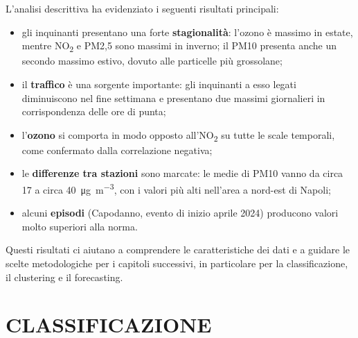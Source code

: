 \documentclass[11pt]{report}
\begin{document}
L'analisi descrittiva ha evidenziato i seguenti risultati principali:
\begin{itemize}
  \item gli inquinanti presentano una forte \textbf{stagionalità}: l'ozono è
        massimo in estate, mentre NO\textsubscript{2} e PM2,5 sono massimi in
        inverno; il PM10 presenta anche un secondo massimo estivo, dovuto alle
        particelle più grossolane;
  \item il \textbf{traffico} è una sorgente importante: gli inquinanti a esso
        legati diminuiscono nel fine settimana e presentano due massimi giornalieri
        in corrispondenza delle ore di punta;
  \item l'\textbf{ozono} si comporta in modo opposto all'NO\textsubscript{2} su
        tutte le scale temporali, come confermato dalla correlazione negativa;
  \item le \textbf{differenze tra stazioni} sono marcate: le medie di PM10 vanno
        da circa 17 a circa \SI{40}{\micro\gram\per\cubic\metre}, con i valori più
        alti nell'area a nord-est di Napoli;
  \item alcuni \textbf{episodi} (Capodanno, evento di inizio aprile 2024)
        producono valori molto superiori alla norma.
\end{itemize}

Questi risultati ci aiutano a comprendere le caratteristiche dei dati e a guidare le scelte metodologiche per 
i capitoli successivi, in particolare per la classificazione, il clustering e il forecasting.


\chapter{CLASSIFICAZIONE}
\end{document}
